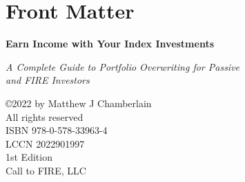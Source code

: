 

\chapter*{Front Matter}\label{Front Matter}

\begin{center}
\textbf{\large{Earn Income with Your Index Investments}}\\

\vspace{0.5cm}

\emph{A Complete Guide to Portfolio Overwriting for Passive\\ and FIRE Investors}\\

\end{center}


\copyright  2022 by Matthew J Chamberlain\\

All rights reserved\\

ISBN 978-0-578-33963-4\\

LCCN 2022901997\\

1st Edition\\

Call to FIRE, LLC\\
